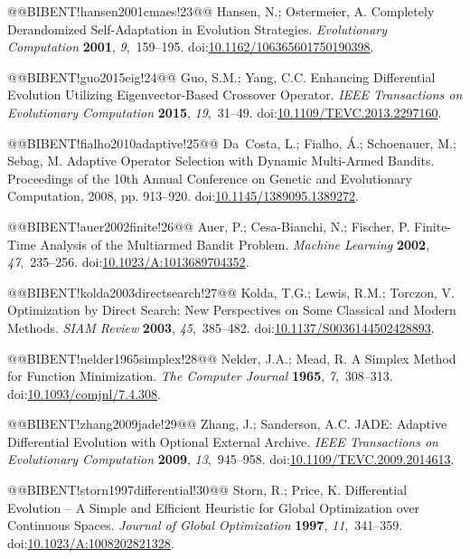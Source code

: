 \documentclass[10pt,a4paper]{article}
\begin{document}
@@BIBENT!hansen2001cmaes!23@@ Hansen, N.; Ostermeier, A. Completely Derandomized Self-Adaptation in Evolution Strategies. \emph{Evolutionary Computation} \textbf{2001}, \emph{9},~159--195. doi:{\href{https://doi.org/10.1162/106365601750190398}{10.1162/106365601750190398}}.

@@BIBENT!guo2015eig!24@@ Guo, S.M.; Yang, C.C. Enhancing Differential Evolution Utilizing Eigenvector-Based Crossover Operator. \emph{IEEE Transactions on Evolutionary Computation} \textbf{2015}, \emph{19},~31--49. doi:{\href{https://doi.org/10.1109/TEVC.2013.2297160}{10.1109/TEVC.2013.2297160}}.

@@BIBENT!fialho2010adaptive!25@@ Da~Costa, L.; Fialho, {\'A}.; Schoenauer, M.; Sebag, M. Adaptive Operator Selection with Dynamic Multi-Armed Bandits. Proceedings of the 10th Annual Conference on Genetic and Evolutionary Computation, 2008, pp. 913--920. doi:{\href{https://doi.org/10.1145/1389095.1389272}{10.1145/1389095.1389272}}.

@@BIBENT!auer2002finite!26@@ Auer, P.; Cesa-Bianchi, N.; Fischer, P. Finite-Time Analysis of the Multiarmed Bandit Problem. \emph{Machine Learning} \textbf{2002}, \emph{47},~235--256. doi:{\href{https://doi.org/10.1023/A:1013689704352}{10.1023/A:1013689704352}}.

@@BIBENT!kolda2003directsearch!27@@ Kolda, T.G.; Lewis, R.M.; Torczon, V. Optimization by Direct Search: New Perspectives on Some Classical and Modern Methods. \emph{SIAM Review} \textbf{2003}, \emph{45},~385--482. doi:{\href{https://doi.org/10.1137/S0036144502428893}{10.1137/S0036144502428893}}.

@@BIBENT!nelder1965simplex!28@@ Nelder, J.A.; Mead, R. A Simplex Method for Function Minimization. \emph{The Computer Journal} \textbf{1965}, \emph{7},~308--313. doi:{\href{https://doi.org/10.1093/comjnl/7.4.308}{10.1093/comjnl/7.4.308}}.

@@BIBENT!zhang2009jade!29@@ Zhang, J.; Sanderson, A.C. {JADE}: Adaptive Differential Evolution with Optional External Archive. \emph{IEEE Transactions on Evolutionary Computation} \textbf{2009}, \emph{13},~945--958. doi:{\href{https://doi.org/10.1109/TEVC.2009.2014613}{10.1109/TEVC.2009.2014613}}.

@@BIBENT!storn1997differential!30@@ Storn, R.; Price, K. Differential Evolution -- A Simple and Efficient Heuristic for Global Optimization over Continuous Spaces. \emph{Journal of Global Optimization} \textbf{1997}, \emph{11},~341--359. doi:{\href{https://doi.org/10.1023/A:1008202821328}{10.1023/A:1008202821328}}.
\end{document}
